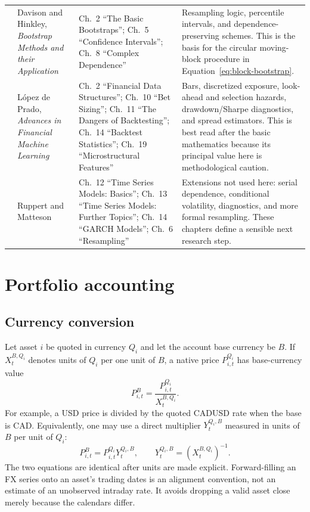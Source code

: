 \documentclass[11pt]{article}
\begin{document}
\begin{longtable}{@{}L{0.065\textwidth}L{0.27\textwidth}L{0.25\textwidth}L{0.31\textwidth}@{}}
 & Davison and Hinkley, \emph{Bootstrap Methods and their Application} \cite{davison1997}
& Ch.~2 ``The Basic Bootstraps''; Ch.~5 ``Confidence Intervals''; Ch.~8 ``Complex Dependence''
& Resampling logic, percentile intervals, and dependence-preserving schemes. This is the basis for the circular moving-block procedure in Equation~\eqref{eq:block-bootstrap}. \\
 & L\'opez de Prado, \emph{Advances in Financial Machine Learning} \cite{lopez2018}
& Ch.~2 ``Financial Data Structures''; Ch.~10 ``Bet Sizing''; Ch.~11 ``The Dangers of Backtesting''; Ch.~14 ``Backtest Statistics''; Ch.~19 ``Microstructural Features''
& Bars, discretized exposure, look-ahead and selection hazards, drawdown/Sharpe diagnostics, and spread estimators. This is best read after the basic mathematics because its principal value here is methodological caution. \\
 & Ruppert and Matteson \cite{ruppert2015}
& Ch.~12 ``Time Series Models: Basics''; Ch.~13 ``Time Series Models: Further Topics''; Ch.~14 ``GARCH Models''; Ch.~6 ``Resampling''
& Extensions not used here: serial dependence, conditional volatility, diagnostics, and more formal resampling. These chapters define a sensible next research step. \\
\bottomrule
\end{longtable}

\section{Portfolio accounting}\label{sec:portfolio}

\subsection{Currency conversion}

Let asset $i$ be quoted in currency $Q_i$ and let the account base currency be $B$. If
$X_t^{B,Q_i}$ denotes units of $Q_i$ per one unit of $B$, a native price $P_{i,t}^{Q_i}$ has
base-currency value
\begin{equation}
 P_{i,t}^{B}=\frac{P_{i,t}^{Q_i}}{X_t^{B,Q_i}}.
 \label{eq:fx}
\end{equation}
For example, a USD price is divided by the quoted CADUSD rate when the base is CAD. Equivalently,
one may use a direct multiplier $Y_t^{Q_i,B}$ measured in units of $B$ per unit of $Q_i$:
\begin{equation}
 P_{i,t}^{B}=P_{i,t}^{Q_i}Y_t^{Q_i,B}, \qquad
 Y_t^{Q_i,B}=\left(X_t^{B,Q_i}\right)^{-1}.
 \label{eq:fx-live}
\end{equation}
The two equations are identical after units are made explicit. Forward-filling an FX series onto
an asset's trading dates is an alignment convention, not an estimate of an unobserved intraday
rate. It avoids dropping a valid asset close merely because the calendars differ.
\end{document}
